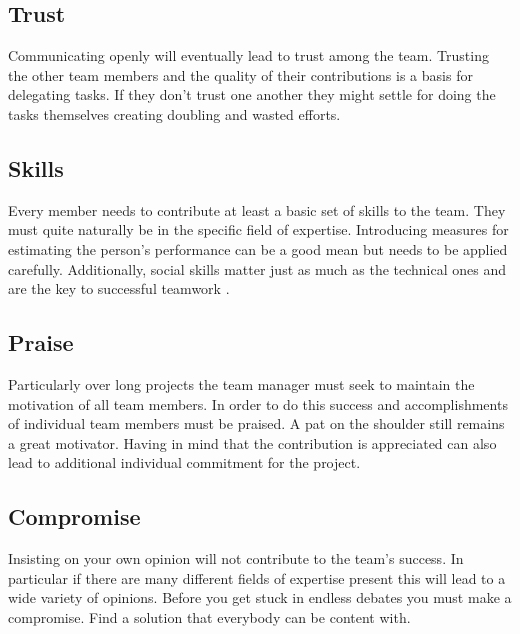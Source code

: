 \begin{multicols}{2}
\subsection{Trust}
Communicating openly will eventually lead to trust among the team. Trusting the other team members and the quality of their contributions is a basis for delegating tasks. If they don’t trust one another they might settle for doing the tasks themselves creating doubling and wasted efforts.

\subsection{Skills}
Every member needs to contribute at least a basic set of skills to the team. They must quite naturally be in the specific field of expertise. Introducing measures for estimating the person’s performance can be a good mean but needs to be applied carefully. Additionally, social skills matter just as much as the technical ones and are the key to successful teamwork \cite{Kawasaki}.

\subsection{Praise}
Particularly over long projects the team manager must seek to maintain the motivation of all team members. In order to do this success and accomplishments of individual team members must be praised. A pat on the shoulder still remains a great motivator. Having in mind that the contribution is appreciated can also lead to additional individual commitment  for the project.

\subsection{Compromise}
Insisting on your own opinion will not contribute to the team’s success. In particular if there are many different fields of expertise present this will lead to a wide variety of opinions. Before you get stuck in endless debates you must make a compromise. Find a solution that everybody can be content with.
\end{multicols}